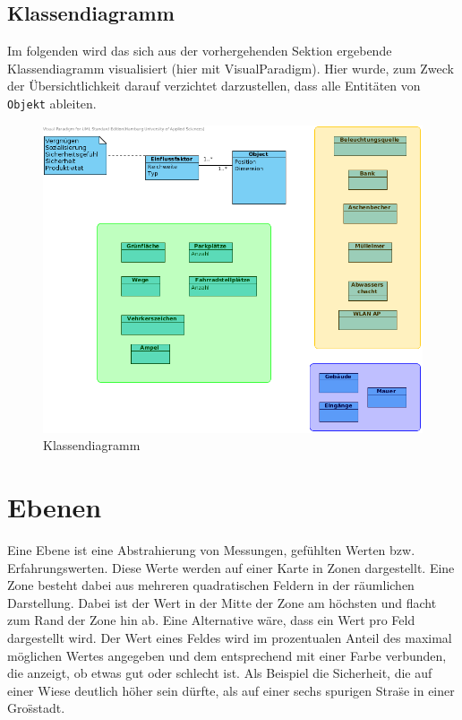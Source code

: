 \documentclass[10pt]{scrartcl}
\begin{document}
	\subsection{Klassendiagramm}
	Im folgenden wird das sich aus der vorhergehenden Sektion ergebende Klassendiagramm visualisiert (hier mit VisualParadigm).
	Hier wurde, zum Zweck der Übersichtlichkeit darauf verzichtet darzustellen, dass alle Entitäten von \verb!Objekt! ableiten.
      \begin{figure}[Htp]
        \centering
                \includegraphics[scale=0.6]{img/ClassDiagram.png}
        \caption{Klassendiagramm}
        \label{img:classDiagram}
        \end{figure}  	
	 
	 

\section{Ebenen}
Eine Ebene ist eine Abstrahierung von Messungen, gef\"uhlten Werten bzw. Erfahrungswerten. Diese Werte werden auf einer Karte in Zonen dargestellt. Eine Zone besteht dabei aus mehreren quadratischen Feldern in der r\"aumlichen Darstellung. Dabei ist der Wert in der Mitte der Zone am h\"ochsten und flacht zum Rand der Zone hin ab. Eine Alternative w\"are, dass ein Wert pro Feld dargestellt wird.
\newline Der Wert eines Feldes wird im prozentualen Anteil des maximal m\"oglichen Wertes angegeben und dem entsprechend mit einer Farbe verbunden, die anzeigt, ob etwas gut oder schlecht ist. Als Beispiel die Sicherheit, die auf einer Wiese deutlich h\"oher sein d\"urfte, als auf einer sechs spurigen Stra\"se in einer Gro\"sstadt.
\end{document}
